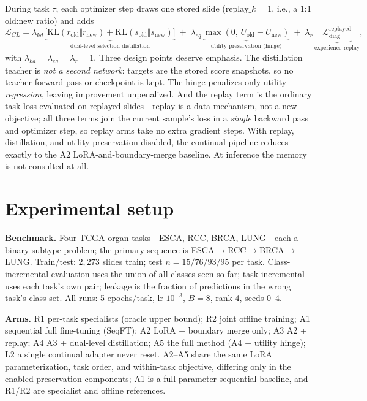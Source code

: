 \documentclass[11pt]{article}
\begin{document}
During task $\tau$, each optimizer step draws one stored slide ($\mathrm{replay}\_k{=}1$, i.e., a 1:1 old:new ratio) and adds
\begin{equation}
\mathcal{L}_{CL} = \lambda_{kd}\,\underbrace{\big[\mathrm{KL}(r_{\mathrm{old}}\Vert r_{\mathrm{new}}) + \mathrm{KL}(s_{\mathrm{old}}\Vert s_{\mathrm{new}})\big]}_{\text{dual-level selection distillation}} \;+\; \lambda_{eq}\,\underbrace{\max(0,\,U_{\mathrm{old}} - U_{\mathrm{new}})}_{\text{utility preservation (hinge)}} \;+\; \lambda_{r}\,\underbrace{\mathcal{L}_{\mathrm{diag}}^{\mathrm{replayed}}}_{\text{experience replay}},
\end{equation}
with $\lambda_{kd}{=}\lambda_{eq}{=}\lambda_{r}{=}1$. Three design points deserve emphasis. The distillation teacher is \emph{not a second network}: targets are the stored score snapshots, so no teacher forward pass or checkpoint is kept. The hinge penalizes only utility \emph{regression}, leaving improvement unpenalized. And the replay term is the ordinary task loss evaluated on replayed slides---replay is a data mechanism, not a new objective; all three terms join the current sample's loss in a \emph{single} backward pass and optimizer step, so replay arms take no extra gradient steps. With replay, distillation, and utility preservation disabled, the continual pipeline reduces exactly to the A2 LoRA-and-boundary-merge baseline. At inference the memory is not consulted at all.

\section{Experimental setup}\label{sec:setup}
\textbf{Benchmark.} Four TCGA organ tasks---ESCA, RCC, BRCA, LUNG---each a binary subtype problem; the primary sequence is ESCA${\to}$RCC${\to}$BRCA${\to}$LUNG. Train/test: $2{,}273$ slides train; test $n=15/76/93/95$ per task. Class-incremental evaluation uses the union of all classes seen so far; task-incremental uses each task's own pair; leakage is the fraction of predictions in the wrong task's class set. All runs: 5 epochs/task, lr $10^{-3}$, $B{=}8$, rank 4, seeds 0--4.

\textbf{Arms.} R1 per-task specialists (oracle upper bound); R2 joint offline training; A1 sequential full fine-tuning (SeqFT); A2 LoRA + boundary merge only; A3 A2 + replay; A4 A3 + dual-level distillation; A5 the full method (A4 + utility hinge); L2 a single continual adapter never reset. A2--A5 share the same LoRA parameterization, task order, and within-task objective, differing only in the enabled preservation components; A1 is a full-parameter sequential baseline, and R1/R2 are specialist and offline references.
\end{document}
